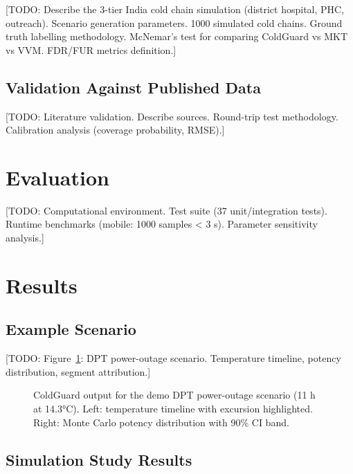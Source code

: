 \documentclass[12pt,a4paper]{article}
\begin{document}
[TODO: Describe the 3-tier India cold chain simulation (district hospital, PHC,
outreach). Scenario generation parameters. 1000 simulated cold chains. Ground
truth labelling methodology. McNemar's test for comparing ColdGuard vs MKT vs
VVM. FDR/FUR metrics definition.]

\subsection{Validation Against Published Data}

[TODO: Literature validation. Describe sources. Round-trip test methodology.
Calibration analysis (coverage probability, RMSE).]

\section{Evaluation}
\label{sec:evaluation}

[TODO: Computational environment. Test suite (37 unit/integration tests).
Runtime benchmarks (mobile: 1000 samples < 3 s). Parameter sensitivity analysis.]

\section{Results}
\label{sec:results}

\subsection{Example Scenario}

[TODO: Figure~\ref{fig:example}: DPT power-outage scenario. Temperature timeline,
potency distribution, segment attribution.]

\begin{figure}[H]
  \centering
  \caption{ColdGuard output for the demo DPT power-outage scenario (11 h at
    14.3°C). Left: temperature timeline with excursion highlighted. Right:
    Monte Carlo potency distribution with 90\% CI band.}
  \label{fig:example}
\end{figure}

\subsection{Simulation Study Results}
\end{document}
